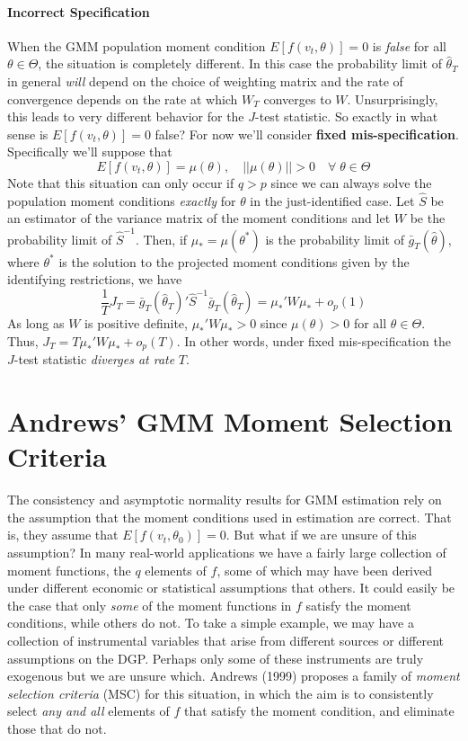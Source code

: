 \paragraph{Incorrect Specification}
When the GMM population moment condition $E[f(v_t,\theta)]=0$ is \emph{false} for all $\theta\in \Theta$, the situation is completely different. In this case the probability limit of $\widehat{\theta}_T$ in general \emph{will} depend on the choice of weighting matrix and the rate of convergence depends on the rate at which $W_T$ converges to $W$. Unsurprisingly, this leads to very different behavior for the $J$-test statistic. So exactly in what sense is $E[f(v_t,\theta)]=0$ false? For now we'll consider \textbf{fixed mis-specification}. Specifically we'll suppose that
	$$E[f(v_t, \theta)] = \mu(\theta), \quad ||\mu(\theta)||>0 \quad \forall \; \theta\in\Theta$$
Note that this situation can only occur if $q>p$ since we can always solve the population moment conditions \emph{exactly} for $\theta$ in the just-identified case. Let $\widehat{S}$ be an estimator of the variance matrix of the moment conditions and let $W$ be the  probability limit of $\widehat{S}^{-1}$. Then, if $\mu_* = \mu(\theta^*)$ is the probability limit of $\bar{g}_T(\widehat{\theta})$, where $\theta^*$ is the solution to the projected moment conditions given by the identifying restrictions, we have
	$$\frac{1}{T} J_T = \bar{g}_T(\widehat{\theta}_T)' \widehat{S}^{-1}\bar{g}_T(\widehat{\theta}_T) = \mu_*' W \mu_* + o_p(1)$$
As long as $W$ is positive definite, $\mu_*' W \mu_*>0$ since $\mu(\theta)>0$ for all $\theta\in \Theta$. Thus, $J_T = T \mu_*' W \mu_* + o_p(T)$. In other words, under fixed mis-specification the $J$-test statistic \emph{diverges at rate} $T$. 

\section{Andrews' GMM Moment Selection Criteria}
The consistency and asymptotic normality results for GMM estimation rely on the assumption that the moment conditions used in estimation are correct. That is, they assume that $E[f(v_t,\theta_0)]=0$. But what if we are unsure of this assumption? In many real-world applications we have a fairly large collection of moment functions, the $q$ elements of $f$, some of which may have been derived under different economic or statistical assumptions that others. It could easily be the case that only \emph{some} of the moment functions in $f$ satisfy the moment conditions, while others do not. To take a simple example, we may have a collection of instrumental variables that arise from different sources or different assumptions on the DGP. Perhaps only some of these instruments are truly exogenous but we are unsure which. Andrews (1999) proposes a family of \emph{moment selection criteria} (MSC) for this situation, in which the aim is to consistently select \emph{any and all} elements of $f$ that satisfy the moment condition, and eliminate those that do not. 

